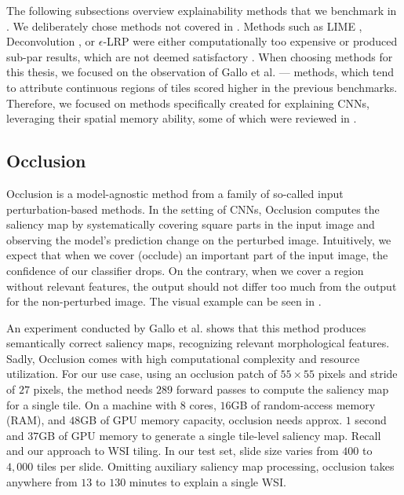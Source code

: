 The following subsections overview explainability methods that we benchmark in .
We deliberately chose methods not covered in \cite{gallo}.
Methods such as LIME \cite{xai-husky}, Deconvolution \cite{deconvolution}, or $\epsilon$-LRP \cite{lrp}  were either computationally too expensive or produced sub-par results, which are not deemed satisfactory \cite{gallo}.
When choosing methods for this thesis, we focused on the observation of Gallo et al. \cite{gallo} --- methods, which tend to attribute continuous regions of tiles scored higher in the previous benchmarks.
Therefore, we focused on methods specifically created for explaining CNNs, leveraging their spatial memory ability, some of which were reviewed in \cite{krajnansky-grad-cam, bajger-grad-cam, hruska-grad-cam}.

\subsection{Occlusion}\label{occlusion}

Occlusion \cite{occlusion} is a model-agnostic method from a family of so-called input perturbation-based methods.
In the setting of CNNs, Occlusion computes the saliency map by systematically covering square parts in the input image and observing the model's prediction change on the perturbed image.
Intuitively, we expect that when we cover (occlude) an important part of the input image, the confidence of our classifier drops.
On the contrary, when we cover a region without relevant features, the output should not differ too much from the output for the non-perturbed image.
The visual example can be seen in .

An experiment conducted by Gallo et al. \cite{gallo} shows that this method produces semantically correct saliency maps, recognizing relevant morphological features.
Sadly, Occlusion comes with high computational complexity and resource utilization.
For our use case, using an occlusion patch of $55 \times 55$ pixels and stride of $27$ pixels, the method needs $289$ forward passes to compute the saliency map for a single tile.
On a machine with $8$ cores, $16$GB of random-access memory (RAM), and $48$GB of GPU memory capacity, occlusion needs approx. $1$ second and $37$GB of GPU memory to generate a single tile-level saliency map.
Recall  and our approach to WSI tiling.
In our test set, slide size varies from $400$ to $4,000$ tiles per slide.
Omitting auxiliary saliency map processing, occlusion takes anywhere from $13$ to $130$ minutes to explain a single WSI.


